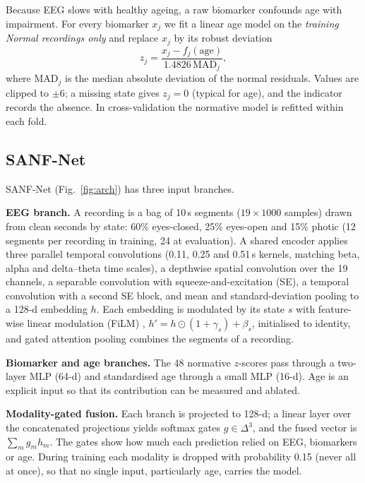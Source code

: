 \documentclass[conference]{IEEEtran}
\begin{document}
Because EEG slows with healthy ageing, a raw biomarker confounds age with impairment. For every
biomarker $x_j$ we fit a linear age model on the \emph{training Normal recordings only} and replace
$x_j$ by its robust deviation
\begin{equation}
z_j = \frac{x_j - f_j(\text{age})}{1.4826\,\mathrm{MAD}_j},
\end{equation}
where $\mathrm{MAD}_j$ is the median absolute deviation of the normal residuals. Values are clipped to
$\pm6$; a missing state gives $z_j=0$ (typical for age), and the indicator records the absence. In
cross-validation the normative model is refitted within each fold.

\subsection{SANF-Net}
\label{sec:model}
SANF-Net (Fig.~\ref{fig:arch}) has three input branches.

\textbf{EEG branch.} A recording is a bag of 10\,s segments ($19 \times 1000$ samples) drawn from clean
seconds by state: 60\% eyes-closed, 25\% eyes-open and 15\% photic (12 segments per recording in
training, 24 at evaluation). A shared encoder applies three parallel temporal convolutions (0.11, 0.25
and 0.51\,s kernels, matching beta, alpha and delta--theta time scales), a depthwise spatial
convolution over the 19 channels, a separable convolution with squeeze-and-excitation (SE), a temporal
convolution with a second SE block, and mean and standard-deviation pooling to a 128-d embedding $h$.
Each embedding is modulated by its state $s$ with feature-wise linear modulation (FiLM)
\cite{perez2018film}, $h' = h\odot(1+\gamma_s)+\beta_s$, initialised to identity, and gated attention
pooling \cite{ilse2018attention} combines the segments of a recording.

\textbf{Biomarker and age branches.} The 48 normative $z$-scores pass through a two-layer MLP (64-d)
and standardised age through a small MLP (16-d). Age is an explicit input so that its contribution
can be measured and ablated.

\textbf{Modality-gated fusion.} Each branch is projected to 128-d; a linear layer over the
concatenated projections yields softmax gates $g\in\Delta^3$, and the fused vector is $\sum_m g_m h_m$.
The gates show how much each prediction relied on EEG, biomarkers or age. During training each
modality is dropped with probability 0.15 (never all at once), so that no single input, particularly
age, carries the model.
\end{document}
